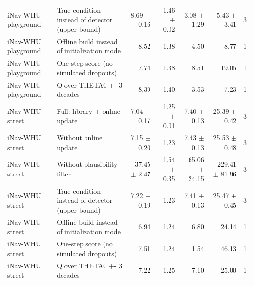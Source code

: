 \begin{tabular}{llrrrrr}
iNav-WHU playground & True condition instead of detector (upper bound) & 8.69 $\pm$ 0.16 & 1.46 $\pm$ 0.02 & 3.08 $\pm$ 1.29 & 5.43 $\pm$ 3.41 & 3 \\
iNav-WHU playground & Offline build instead of initialization mode & 8.52 & 1.38 & 4.50 & 8.77 & 1 \\
iNav-WHU playground & One-step score (no simulated dropouts) & 7.74 & 1.38 & 8.51 & 19.05 & 1 \\
iNav-WHU playground & Q over THETA0 +- 3 decades & 8.39 & 1.40 & 3.53 & 7.23 & 1 \\
iNav-WHU street & Full: library + online update & 7.04 $\pm$ 0.17 & 1.25 $\pm$ 0.01 & 7.40 $\pm$ 0.13 & 25.39 $\pm$ 0.42 & 3 \\
iNav-WHU street & Without online update & 7.15 $\pm$ 0.20 & 1.23 & 7.43 $\pm$ 0.13 & 25.53 $\pm$ 0.48 & 3 \\
iNav-WHU street & Without plausibility filter & 37.45 $\pm$ 2.47 & 1.54 $\pm$ 0.35 & 65.06 $\pm$ 24.15 & 229.41 $\pm$ 81.96 & 3 \\
iNav-WHU street & True condition instead of detector (upper bound) & 7.22 $\pm$ 0.19 & 1.23 & 7.41 $\pm$ 0.13 & 25.47 $\pm$ 0.45 & 3 \\
iNav-WHU street & Offline build instead of initialization mode & 6.94 & 1.24 & 6.80 & 24.14 & 1 \\
iNav-WHU street & One-step score (no simulated dropouts) & 7.51 & 1.24 & 11.54 & 46.13 & 1 \\
iNav-WHU street & Q over THETA0 +- 3 decades & 7.22 & 1.25 & 7.10 & 25.00 & 1 \\
\bottomrule
\end{tabular}
